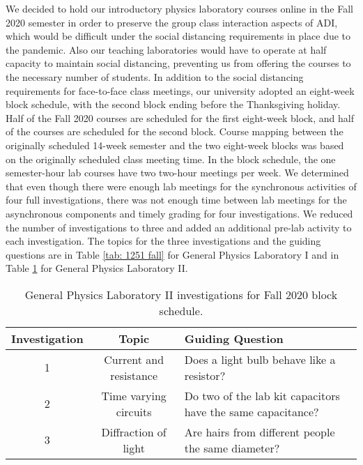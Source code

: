 \documentclass[aip, numerical, preprint]{revtex4-2}
\begin{document}
We decided to hold our introductory physics laboratory courses online in the Fall 2020 semester in order to preserve the group class interaction aspects of ADI, which would be difficult under the social distancing requirements in place due to the pandemic.\citep{mclber20}  Also our teaching laboratories would have to operate at half capacity to maintain social distancing, preventing us from offering the courses to the necessary number of students.  In addition to the social distancing requirements for face-to-face class meetings, our university adopted an eight-week block schedule, with the second block ending before the Thanksgiving holiday. Half of the Fall 2020 courses are scheduled for the first eight-week block, and half of the courses are scheduled for the second block. Course mapping between the originally scheduled 14-week semester and the two eight-week blocks was based on the originally scheduled class meeting time. In the block schedule, the one semester-hour lab courses have two two-hour meetings per week. We determined that even though there were enough lab meetings for the synchronous activities of four full investigations, there was not enough time between lab meetings for the asynchronous components and timely grading for four investigations. We reduced the number of investigations to three and added an additional pre-lab activity to each investigation. The topics for the three investigations and the guiding questions are in Table \ref{tab: 1251 fall} for General Physics Laboratory I and in Table \ref{tab: 1261 fall} for General Physics Laboratory II.

\begin{table}
    \caption{\label{tab: 1261 fall} General Physics Laboratory II investigations for Fall 2020 block schedule.}
    \begin{ruledtabular}
        \begin{tabular}{ccp{26em}}
            Investigation & Topic & Guiding Question\\
            \hline
            1 & Current and resistance & Does a light bulb behave like a resistor? \\
            2 & Time varying circuits & Do two of the lab kit capacitors have the same capacitance? \\
            3 & Diffraction of light & Are hairs from different people the same diameter?
        \end{tabular}
    \end{ruledtabular}
\end{table}
\end{document}
